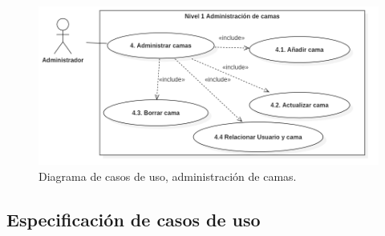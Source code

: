 \begin{figure}[H]
	\centering
	\includegraphics[width=1\textwidth]{../img/cu-n1-4.png}
	\caption{Diagrama de casos de uso, administración de camas.}
	\label{fig:cu-n1.4}
\end{figure}

\subsection{Especificación de casos de uso}

